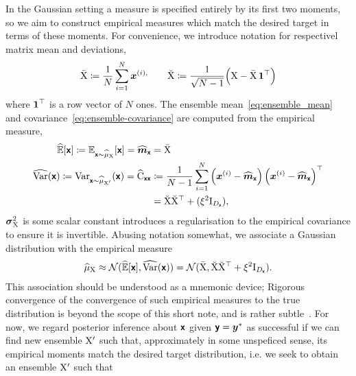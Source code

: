 \documentclass[wcp]{jmlr} %
\begin{document}
In the Gaussian setting a measure is specified entirely by its first two moments, so we aim to construct empirical measures which match the desired target in terms of these moments.
For convenience, we introduce notation for respectivel matrix mean and deviations,
\begin{align}
    \bar{\mathrm{X}} \coloneq \frac{1}{N}\sum_{i=1}^N \boldsymbol{x}^{(i),}
    \quad\quad
    \breve{\mathrm{X}} \coloneq \frac{1}{\sqrt{N-1}} \Bigl( \mathrm{X} - \bar{\mathrm{X}}\,\boldsymbol{1}^\top \Bigr)
     \label{eq:deviation_matrix}
\end{align}
where \(\boldsymbol{1}^\top\) is a row vector of \(N\) ones.
The ensemble mean~\eqref{eq:ensemble_mean} and covariance~\eqref{eq:ensemble-covariance}  are computed from the empirical measure,
\begin{align}
    \widehat{\Ex}[\vrv{x}]\coloneq \Ex_{\vrv{x}\sim \ELaw[\mm{X}]}[ \vrv{x}] =\widehat{\vv{m}}_{\vrv{x}}
&=\mmmean{X}\label{eq:ensemble_mean} \\
\widehat{\var}(\vrv{x}) \coloneq\var_{\vrv{x}\sim \ELaw[\mm{X}']} (\vrv{x})=\widehat{\mm{C}}_{\vrv{xx}} &\coloneq \frac{1}{N-1} \sum_{i=1}^{N} \left(\vv{x}^{(i)} - \widehat{\vv{m}}_{\vrv{x}}\right)\left(\vv{x}^{(i)} - \widehat{\vv{m}}_{\vrv{x}}\right)^\top  \\
&=\mmdev{X} \mmdev{X}^\top + (\xi^2\mm{I}_{D_{\vrv{x}}}),\label{eq:ensemble-covariance}
\end{align}
$\boldsymbol{\sigma}_{\mathrm{X}}^2$ is some scalar constant introduces a regularisation to the empirical covariance to ensure it is invertible.
Abusing notation somewhat, we associate a Gaussian distribution with the empirical measure
\begin{align}
\ELaw[\mm{X}] \approx \Normal(\widehat{\Ex}[\vrv{x}], \widehat{\var}(\vrv{x})) = \Normal(\mmmean{X}, \mmdev{X} \mmdev{X}^\top + \xi^2\mm{I}_{D_{\vrv{x}}}).
\end{align}
This association should be understood as a mnemonic device;
Rigorous convergence of the convergence of such empirical measures to the true distribution is beyond the scope of this short note, and is rather subtle~\citep{LeGland2009Large,Mandel2011Convergence,Kelly2014Wellposedness,Kwiatkowski2015Convergence,DelMoral2017Stability}.
For now, we regard posterior inference about $\boldsymbol{\mathsf{x}}$ given $\boldsymbol{\mathsf{y}}=\boldsymbol{y}^*$ as successful if we can find  new ensemble $\mathrm{X}'$ such that, approximately in some unspeficed sense, its empirical moments match the desired target distribution, i.e. we seek to obtain an ensemble $\mathrm{X}'$ such that
\end{document}
